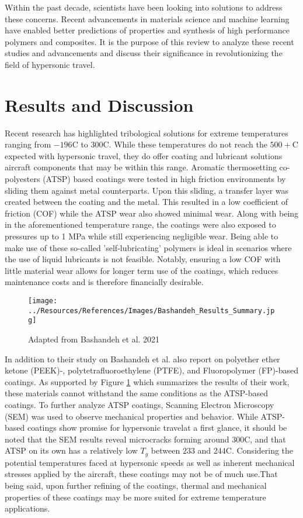 \documentclass[12pt]{article}
\begin{document}
\indent Within the past decade, scientists have been looking into solutions to address these concerns. Recent advancements in materials science and machine learning have enabled better predictions of properties and synthesis of high performance polymers and composites. It is the purpose of this review to analyze these recent studies and advancements and discuss their significance in revolutionizing the field of hypersonic travel.
	
\section{Results and Discussion}

\indent Recent research has highlighted tribological solutions for extreme temperatures ranging from $-196$\degree C to $300$\degree C. While these temperatures do not reach the $500+$\degree C expected with hypersonic travel, they do offer coating and lubricant solutions aircraft components that may be within this range. Aromatic thermosetting co-polyesters (ATSP) based coatings were tested in high friction environments by sliding them against metal counterparts. Upon this sliding, a transfer layer was created between the coating and the metal. This resulted in a low coefficient of friction (COF) while the ATSP wear also showed minimal wear. Along with being in the aforementioned temperature range, the coatings were also exposed to pressures up to 1 MPa while still experiencing negligible wear. \citep{Bashandeh2021} Being able to make use of these so-called 'self-lubricating' polymers is ideal in scenarios where the use of liquid lubricants is not feasible. Notably, ensuring a low COF with little material wear allows for longer term use of the coatings, which reduces maintenance costs and is therefore financially desirable.

\begin{figure}[h]
    \centering
    \texttt{[image: ../Resources/References/Images/Bashandeh\_Results\_Summary.jpg]}
    \caption{\scriptsize{Adapted from Bashandeh et al. 2021 \citep{Bashandeh2021}}}
    \label{fig:Bashandeh-Summary}
\end{figure}

\indent In addition to their study on Bashandeh et al. also report on polyether ether ketone (PEEK)-, polytetrafluoroethylene (PTFE), and Fluoropolymer (FP)-based coatings. As supported by Figure \ref{fig:Bashandeh-Summary} which summarizes the results of their work, these materials cannot withstand the same conditions as the ATSP-based coatings. To further analyze ATSP coatings, Scanning Electron Microscopy (SEM) was used to observe mechanical properties and behavior. While ATSP-based coatings show promise for hypersonic travelat a first glance, it should be noted that the SEM results reveal microcracks forming around 300\degree C, and that ATSP on its own has a relatively low $T_g$ between $233$ and $244$\degree C. Considering the potential temperatures faced at hypersonic speeds as well as inherent mechanical stresses applied by the aircraft, these coatings may not be of much use.That being said, upon further refining of the coatings, thermal and mechanical properties of these coatings may be more suited for extreme temperature applications. 
\end{document}
